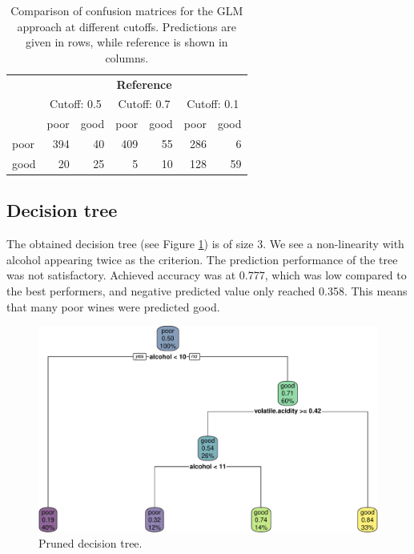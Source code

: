 \documentclass[11pt,]{article}
\begin{document}
\begin{table}[!h]

\caption{\label{tab:crossTabReg1}Comparison of confusion matrices for the GLM approach at different cutoffs. Predictions are given in rows, while reference is shown in columns.}
\centering
\begin{tabular}[t]{lrrrrrr}
\toprule
\multicolumn{1}{c}{\bfseries  } & \multicolumn{6}{c}{\bfseries Reference} \\
\cmidrule(l{2pt}r{2pt}){2-7}
\multicolumn{1}{c}{ } & \multicolumn{2}{c}{Cutoff: 0.5} & \multicolumn{2}{c}{Cutoff: 0.7} & \multicolumn{2}{c}{Cutoff: 0.1} \\
\cmidrule(l{2pt}r{2pt}){2-3} \cmidrule(l{2pt}r{2pt}){4-5} \cmidrule(l{2pt}r{2pt}){6-7}
  & poor & good & poor & good & poor & good\\
\midrule
poor & 394 & 40 & 409 & 55 & 286 & 6\\
good & 20 & 25 & 5 & 10 & 128 & 59\\
\bottomrule
\end{tabular}
\end{table}

\hypertarget{decision-tree-1}{%
\subsection{Decision tree}\label{decision-tree-1}}

The obtained decision tree (see Figure \ref{fig:prunedtree}) is of size
3. We see a non-linearity with alcohol appearing twice as the criterion.
The prediction performance of the tree was not satisfactory. Achieved
accuracy was at 0.777, which was low compared to the best performers,
and negative predicted value only reached 0.358. This means that many
poor wines were predicted good.

\begin{figure}

{\centering \includegraphics[width=0.75\linewidth]{./figures/prunedtree-1} 

}

\caption{Pruned decision tree.}\label{fig:prunedtree}
\end{figure}
\end{document}
